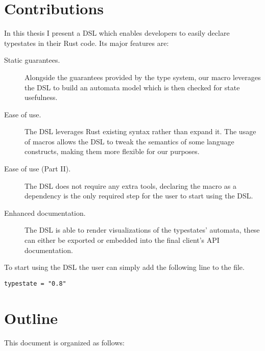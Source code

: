 
\section{Contributions}\label{sec:objectives}

In this thesis I present a \gls{DSL} which enables developers to easily declare typestates in their Rust code.
Its major features are:

\begin{description}
    \item[Static guarantees.] Alongside the guarantees provided by the type system,
    our macro leverages the \gls{DSL} to build an automata model which is then checked for state usefulness.
    \item[Ease of use.] The \gls{DSL} leverages Rust existing syntax rather than expand it.
    The usage of macros allows the \gls{DSL} to tweak the semantics of some language constructs,
    making them more flexible for our purposes.
    \item[Ease of use (Part II).] The \gls{DSL} does not require any extra tools,
    declaring the macro as a dependency is the only required step for the user to start using the \gls{DSL}.
    \item[Enhanced documentation.] The \gls{DSL} is able to render visualizations of the typestates' automata,
    these can either be exported or embedded into the final client's \gls{API} documentation.
\end{description}
To start using the DSL the user can simply add the following line to the  file.
\begin{verbatim}
typestate = "0.8"
\end{verbatim}

\section{Outline}\label{sec:organization}

This document is organized as follows:

